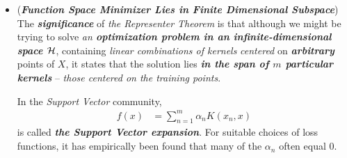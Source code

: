 \documentclass[11pt]{article}
\begin{document}
\begin{itemize}
\item \begin{remark} (\emph{\textbf{Function Space Minimizer Lies in Finite Dimensional Subspace}})\\
The \emph{\textbf{significance}} of \emph{the Representer Theorem} is that although we might be trying to solve \emph{an \textbf{optimization problem in an infinite-dimensional space ${\mathcal H}$}}, containing \emph{linear combinations of kernels} \emph{centered} on \emph{\textbf{arbitrary}} points of $X$, it states that the solution lies \emph{\textbf{in the span of $m$ particular kernels}} --  \emph{those centered on the training points}.

In the \emph{Support Vector} community,
\begin{align*}
f(x) &= \sum_{n=1}^{m}\alpha_n K(x_n, x)
\end{align*}  is called \emph{\textbf{the Support Vector expansion}}. For suitable choices of loss functions, it has empirically been found that many of the $\alpha_n$ often equal $0$.
\end{remark}
\end{itemize}
\end{document}

